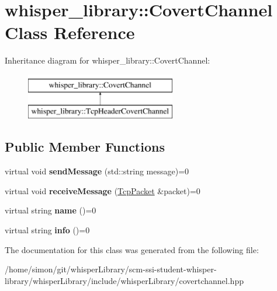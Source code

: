\hypertarget{classwhisper__library_1_1CovertChannel}{\section{whisper\-\_\-library\-:\-:\-Covert\-Channel \-Class \-Reference}
\label{classwhisper__library_1_1CovertChannel}
}
\-Inheritance diagram for whisper\-\_\-library\-:\-:\-Covert\-Channel\-:\begin{figure}[H]
\begin{center}
\leavevmode
\includegraphics[height=2.000000cm]{classwhisper__library_1_1CovertChannel}
\end{center}
\end{figure}
\subsection*{\-Public \-Member \-Functions}
\begin{DoxyCompactItemize}
\item 
\hypertarget{classwhisper__library_1_1CovertChannel_a4247c86b399f304da2e066b387158b2c}{virtual void {\bfseries send\-Message} (std\-::string message)=0}\label{classwhisper__library_1_1CovertChannel_a4247c86b399f304da2e066b387158b2c}

\item 
\hypertarget{classwhisper__library_1_1CovertChannel_a83a9e7ac93601466469c29778007ade2}{virtual void {\bfseries receive\-Message} (\hyperlink{classwhisper__library_1_1TcpPacket}{\-Tcp\-Packet} \&packet)=0}\label{classwhisper__library_1_1CovertChannel_a83a9e7ac93601466469c29778007ade2}

\item 
\hypertarget{classwhisper__library_1_1CovertChannel_a719aad665f195cb1575429eed0706804}{virtual string {\bfseries name} ()=0}\label{classwhisper__library_1_1CovertChannel_a719aad665f195cb1575429eed0706804}

\item 
\hypertarget{classwhisper__library_1_1CovertChannel_ad64b91a1eb27929d9d35f417fb2d524a}{virtual string {\bfseries info} ()=0}\label{classwhisper__library_1_1CovertChannel_ad64b91a1eb27929d9d35f417fb2d524a}

\end{DoxyCompactItemize}


\-The documentation for this class was generated from the following file\-:\begin{DoxyCompactItemize}
\item 
/home/simon/git/whisper\-Library/scm-\/ssi-\/student-\/whisper-\/library/whisper\-Library/include/whisper\-Library/covertchannel.\-hpp\end{DoxyCompactItemize}
